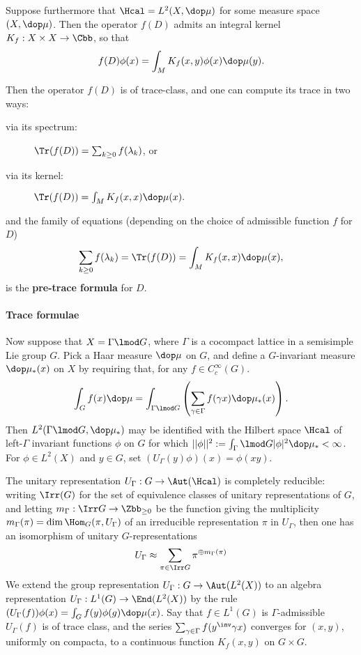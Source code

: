 Suppose furthermore that $\Hcal = L^2(X,\dop \mu)$ for some measure space $(X,\dop \mu)$. Then the operator $f(D)$ admits an integral kernel $K_f : X\times X \to \Cbb$, so that
\begin{align}\label{eq:kernel}
  f(D) \phi(x) = \int_M K_f(x,y)\phi(x) \dop \mu(y).
\end{align}

Then the operator $f(D)$ is of trace-class, and one can compute its trace in two ways:
\begin{description}
  \item[via its spectrum:] $ \Tr(f(D)) = \sum_{k\geq 0} f(\lambda_k)$, or
  \item[via its kernel:] $\Tr(f(D)) = \int_{M} K_f(x,x) \dop \mu(x).$
\end{description}
and the family of equations (depending on the choice of admissible function $f$ for $D$)
\begin{align}
  \sum_{k\geq 0} f(\lambda_k) = \Tr(f(D)) = \int_{M} K_f(x,x) \dop \mu(x),
\end{align}
is the \textbf{pre-trace formula} for $D$.

\paragraph{Trace formulae}
Now suppose that $X = \Gamma \lmod G$,  where $\Gamma$ is a cocompact lattice in a semisimple Lie group $G$. Pick a Haar measure $\dop \mu$ on $G$, and define a $G$-invariant measure $\dop \mu_*(x)$ on $X$ by requiring that, for any $f\in C_c^\infty(G)$.
\begin{align}
  \int_G f(x) \dop \mu =  \int_{\Gamma \lmod G} \left( \sum_{\gamma \in \Gamma} f(\gamma x) \dop \mu_*(x) \right).
\end{align}
Then $L^2(\Gamma \lmod G , \dop \mu_*)$ may be identified with the Hilbert space $\Hcal$ of  left-$\Gamma$ invariant functions $\phi$ on $G$ for which $||\phi||^2:=\int_\Gamma \lmod G |\phi|^2 \dop \mu_* <\infty$. For $\phi \in L^2(X)$ and $y \in G$, set $(U_\Gamma(y)\phi) (x) = \phi(xy)$.

The unitary representation $U_\Gamma:G \to \Aut(\Hcal)$ is completely reducible: writing $\Irr(G)$ for the set of equivalence classes of unitary representations of $G$, and letting $m_\Gamma : \Irr G \to \Zbb_{\geq 0}$ be the function giving the multiplicity $m_\Gamma(\pi)  = \dim \Hom_G (\pi , U_\Gamma)$  of an irreducible representation $\pi$  in $U_\Gamma$, then one has an isomorphism of unitary $G$-representations
\begin{align}
  U_\Gamma \approx \sum_{\pi \in \Irr G} \pi^{\oplus m_\Gamma(\pi)}
\end{align}
We extend the group representation $U_\Gamma : G \to \Aut(L^2(X))$ to an algebra representation $U_\Gamma: L^1(G)\to \End(L^2(X))$ by the rule $(U_\Gamma(f)) \phi(x) = \int_G f(y)\phi(g) \dop \mu (x)$. Say that $f \in L^1(G)$ is $\Gamma$-admissible $U_\Gamma(f)$ is of trace class,  and the series $\sum_{\gamma \in \Gamma}f(y^\inv \gamma x)$ converges for $(x,y)$, uniformly on compacta, to a continuous function $K_f(x,y)$ on $G\times G$.

